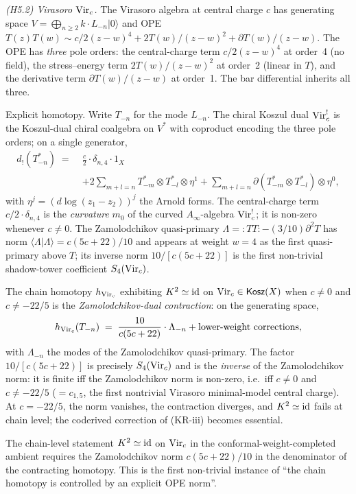 \emph{(H5.2) Virasoro $\mathrm{Vir}_c$.} The Virasoro algebra at central
charge $c$ has generating space
$V = \bigoplus_{n\geq 2}k\cdot L_{-n}|0\rangle$ and OPE
$T(z)T(w)\sim c/2(z-w)^{4}+2T(w)/(z-w)^{2}+\partial T(w)/(z-w)$.
The OPE has \emph{three} pole orders: the central-charge term
$c/2(z-w)^{4}$ at order~4 (no field), the stress--energy term
$2T(w)/(z-w)^{2}$ at order~2 (linear in $T$), and the derivative
term $\partial T(w)/(z-w)$ at order~1. The bar differential inherits
all three.

Explicit homotopy. Write $T_{-n}$ for the mode $L_{-n}$.
The chiral Koszul dual $\mathrm{Vir}_c^{!}$ is the Koszul-dual chiral coalgebra
on $V^{*}$ with coproduct encoding the three pole orders; on a single
generator,
\begin{align*}
d_{!}(T_{-n}^{*}) \;=\; &
\tfrac{c}{2}\cdot\delta_{n,4}\cdot 1_{X} \\
& + 2\sum_{m+l=n}T_{-m}^{*}\otimes T_{-l}^{*}\otimes\eta^{1}
  + \sum_{m+l=n}\partial(T_{-m}^{*}\otimes T_{-l}^{*})\otimes\eta^{0},
\end{align*}
with $\eta^{j} = (d\log(z_{1}-z_{2}))^{j}$ the Arnold forms. The
central-charge term $c/2\cdot\delta_{n,4}$ is the \emph{curvature}
$m_{0}$ of the curved $A_{\infty}$-algebra $\mathrm{Vir}_c^{!}$; it is
non-zero whenever $c\neq 0$. The Zamolodchikov quasi-primary
$\Lambda = {:}TT{:} - (3/10)\partial^{2}T$ has norm
$\langle\Lambda|\Lambda\rangle = c(5c+22)/10$ and appears at weight
$w=4$ as the first quasi-primary above $T$; its inverse norm
$10/[c(5c+22)]$ is the first non-trivial shadow-tower coefficient
$S_{4}(\mathrm{Vir}_c)$.

The chain homotopy $h_{\mathrm{Vir}_c}$ exhibiting $K^{2}\simeq\mathrm{id}$ on
$\mathrm{Vir}_c\in\mathsf{Kosz}(X)$ when $c\neq 0$ and $c\neq -22/5$ is the
\emph{Zamolodchikov-dual contraction}: on the generating space,
\[
h_{\mathrm{Vir}_c}(T_{-n}) \;=\; \frac{10}{c(5c+22)}\cdot\Lambda_{-n} + \text{lower-weight corrections},
\]
with $\Lambda_{-n}$ the modes of the Zamolodchikov quasi-primary. The
factor $10/[c(5c+22)]$ is precisely $S_{4}(\mathrm{Vir}_c)$ and is the
\emph{inverse} of the Zamolodchikov norm: it is finite iff the
Zamolodchikov norm is non-zero, i.e.\ iff $c\neq 0$ and $c\neq -22/5$
($= c_{1,5}$, the first nontrivial Virasoro minimal-model central
charge). At $c = -22/5$, the norm vanishes, the contraction
diverges, and $K^{2}\simeq\mathrm{id}$ fails at chain level; the coderived
correction of (KR-iii) becomes essential.

The chain-level statement $K^{2}\simeq\mathrm{id}$ on $\mathrm{Vir}_c$ in the
conformal-weight-completed ambient requires the Zamolodchikov norm
$c(5c+22)/10$ in the denominator of the contracting homotopy. This
is the first non-trivial instance of ``the chain homotopy is
controlled by an explicit OPE norm''.

